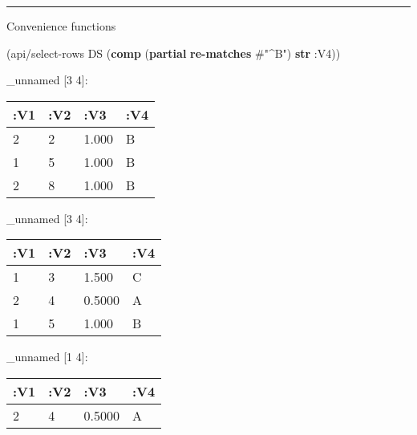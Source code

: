 \documentclass[]{article}
\newenvironment{Shaded}{\begin{snugshade}}{\end{snugshade}}
\newcommand{\KeywordTok}[1]{\textcolor[rgb]{0.13,0.29,0.53}{\textbf{#1}}}
\newcommand{\DecValTok}[1]{\textcolor[rgb]{0.00,0.00,0.81}{#1}}
\newcommand{\SpecialStringTok}[1]{\textcolor[rgb]{0.31,0.60,0.02}{#1}}
\newcommand{\VariableTok}[1]{\textcolor[rgb]{0.00,0.00,0.00}{#1}}
\newcommand{\AttributeTok}[1]{\textcolor[rgb]{0.77,0.63,0.00}{#1}}
\newcommand{\NormalTok}[1]{#1}
\begin{document}
\begin{center}\rule{0.5\linewidth}{0.5pt}\end{center}

Convenience functions

\begin{Shaded}
\begin{Highlighting}[]
\NormalTok{(api/select-rows DS (}\KeywordTok{comp}\NormalTok{ (}\KeywordTok{partial} \KeywordTok{re-matches} \SpecialStringTok{#"^B"}\NormalTok{) }\KeywordTok{str} \AttributeTok{:V4}\NormalTok{))}
\end{Highlighting}
\end{Shaded}

\_unnamed {[}3 4{]}:

\begin{longtable}[]{@{}llll@{}}
\toprule
:V1 & :V2 & :V3 & :V4\tabularnewline
\midrule
\endhead
2 & 2 & 1.000 & B\tabularnewline
1 & 5 & 1.000 & B\tabularnewline
2 & 8 & 1.000 & B\tabularnewline
\bottomrule
\end{longtable}

\begin{Shaded}
\end{Shaded}

\_unnamed {[}3 4{]}:

\begin{longtable}[]{@{}llll@{}}
\toprule
:V1 & :V2 & :V3 & :V4\tabularnewline
\midrule
\endhead
1 & 3 & 1.500 & C\tabularnewline
2 & 4 & 0.5000 & A\tabularnewline
1 & 5 & 1.000 & B\tabularnewline
\bottomrule
\end{longtable}

\begin{Shaded}
\end{Shaded}

\_unnamed {[}1 4{]}:

\begin{longtable}[]{@{}llll@{}}
\toprule
:V1 & :V2 & :V3 & :V4\tabularnewline
\midrule
\endhead
2 & 4 & 0.5000 & A\tabularnewline
\bottomrule
\end{longtable}
\end{document}
